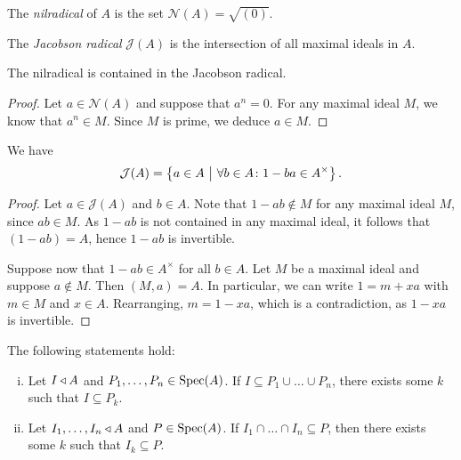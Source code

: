 \begin{definicija}
The \emph{nilradical} of $A$ is the set
$\mathcal{N}(A) = \sqrt{(0)}$.
\end{definicija}

\begin{definicija}
The \emph{Jacobson radical}
$\mathcal{J}(A)$ is the intersection of all maximal ideals in $A$.
\end{definicija}

\begin{lema}
The nilradical is contained in the Jacobson radical.
\end{lema}

\begin{proof}
Let $a \in \mathcal{N}(A)$ and suppose that $a^n = 0$. For any
maximal ideal $M$, we know that $a^n \in M$. Since $M$ is prime, we
deduce $a \in M$.
\end{proof}

\begin{lema}
We have
\[
\mathcal{J}(A) =
\left\{a \in A~\middle\vert~\forall b \in A \colon 1 - ba \in A^\times\right\}.
\]
\end{lema}

\begin{proof}
Let $a \in \mathcal{J}(A)$ and $b \in A$. Note that
$1 - ab \not \in M$ for any maximal ideal $M$, since $ab \in M$.
As $1 - ab$ is not contained in any maximal ideal, it follows that
$(1-ab) = A$, hence $1-ab$ is invertible.

Suppose now that $1 - ab \in A^\times$ for all $b \in A$. Let $M$
be a maximal ideal and suppose $a \not \in M$. Then $(M, a) = A$.
In particular, we can write $1 = m + xa$ with $m \in M$ and
$x \in A$. Rearranging, $m = 1 - xa$, which is a contradiction, as
$1-xa$ is invertible.
\end{proof}

\begin{lema}
The following statements hold:

\begin{enumerate}[i)]
\item Let $I \triangleleft A$ and $P_1, \dots, P_n \in \operatorname{Spec}(A)$. If
$I \subseteq P_1 \cup \dots \cup P_n$, there exists some $k$ such
that $I \subseteq P_k$.
\item Let $I_1, \dots, I_n \triangleleft A$ and $P \in \operatorname{Spec}(A)$. If
$I_1 \cap \dots \cap I_n \subseteq P$, then there exists some $k$
such that $I_k \subseteq P$.
\end{enumerate}
\end{lema}

